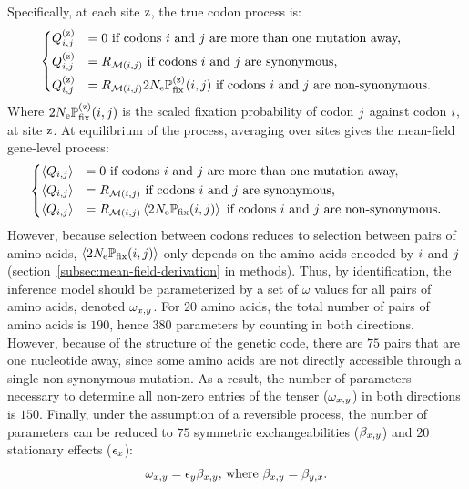 \documentclass{article}
\begin{document}
Specifically, at each site $\text{z}$, the true codon process is:
\begin{equation}
    \begin{dcases}
        Q_{{i}, {j}}^{(\text{z})} & = 0 \text{ if codons ${i}$ and ${j}$ are more than one mutation away,} \\
        Q_{{i}, {j}}^{(\text{z})} & = R_{\mathcal{M}({i}, {j})} \text{ if codons ${i}$ and ${j}$ are {synonymous},} \\
        Q_{{i}, {j}}^{(\text{z})} & = R_{\mathcal{M}({i}, {j})} 2 N_{\text{e}} \mathbb{P}_{\text{fix}}^{(\text{z})}({i}, {j}) \text{ if codons ${i}$ and ${j}$ are non-synonymous}.
    \end{dcases}
    \label{eq:codon-site-processs}
\end{equation}
Where $2 N_{\text{e}} \mathbb{P}_{\text{fix}}^{(\text{z})}({i}, {j})$ is the scaled fixation probability of codon ${j}$ against codon ${i}$, at site $\text{z}$.
At equilibrium of the process, averaging over sites gives the mean-field gene-level process:
\begin{equation}
    \begin{dcases}
        \left\langle Q_{{i}, {j}} \right\rangle & = 0 \text{ if codons ${i}$ and ${j}$ are more than one mutation away,} \\
        \left\langle Q_{{i}, {j}} \right\rangle & = R_{\mathcal{M}({i}, {j})} \text{ if codons ${i}$ and ${j}$ are {synonymous},} \\
        \left\langle Q_{{i}, {j}} \right\rangle & = R_{\mathcal{M}({i}, {j})} \left\langle 2 N_{\text{e}} \mathbb{P}_{\text{fix}} ({i}, {j}) \right\rangle \text{ if codons ${i}$ and ${j}$ are non-synonymous}.
    \end{dcases}
    \label{eq:codon-avg-process}
\end{equation}
However, because selection between codons reduces to selection between pairs of amino-acids, $\left\langle 2 N_{\text{e}} \mathbb{P}_{\text{fix}} ({i}, {j}) \right\rangle$ only depends on the amino-acids encoded by ${i}$ and ${j}$ (section~\ref{subsec:mean-field-derivation} in methods).
Thus, by identification, the inference model should be parameterized by a set of $\omega$ values for all pairs of amino acids, denoted $\omega_{x, y}$.
For $20$ amino acids, the total number of pairs of amino acids is $190$, hence $380$ parameters by counting in both directions.
However, because of the structure of the genetic code, there are $75$ pairs that are one nucleotide away, since some amino acids are not directly accessible through a single {non-synonymous} mutation.
As a result, the number of parameters necessary to determine all non-zero entries of the tenser ($\omega_{x, y}$) in both directions is $150$.
Finally, under the assumption of a reversible process, the number of parameters can be reduced to $75$ symmetric exchangeabilities ($\beta_{x, y}$) and $20$ stationary effects ($\epsilon_{x}$):
\begin{equation}
    \omega_{x, y} = \epsilon_{y} \beta_{x, y}\text{, where } \beta_{x, y} = \beta_{y, x}.\label{eq:omega-reversible}
\end{equation}
\end{document}
